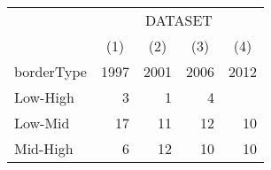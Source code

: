 \begin{center}
\begin{threeparttable}[!h]
\begin{tabular}{lrrrr}
\toprule
&\multicolumn{4}{c}{DATASET} \\
&\multicolumn{1}{c}{(1)}&\multicolumn{1}{c}{(2)}&\multicolumn{1}{c}{(3)}&\multicolumn{1}{c}{(4)}\\
borderType&\multicolumn{1}{c}{1997}&\multicolumn{1}{c}{2001}&\multicolumn{1}{c}{2006}&\multicolumn{1}{c}{2012}\\
\midrule
Low-High            &           3&           1&           4\\
Low-Mid             &          17&          11&          12&          10\\
Mid-High            &           6&          12&          10&          10\\
\bottomrule
\bottomrule
\end{tabular}
\end{threeparttable}
\end{center}
